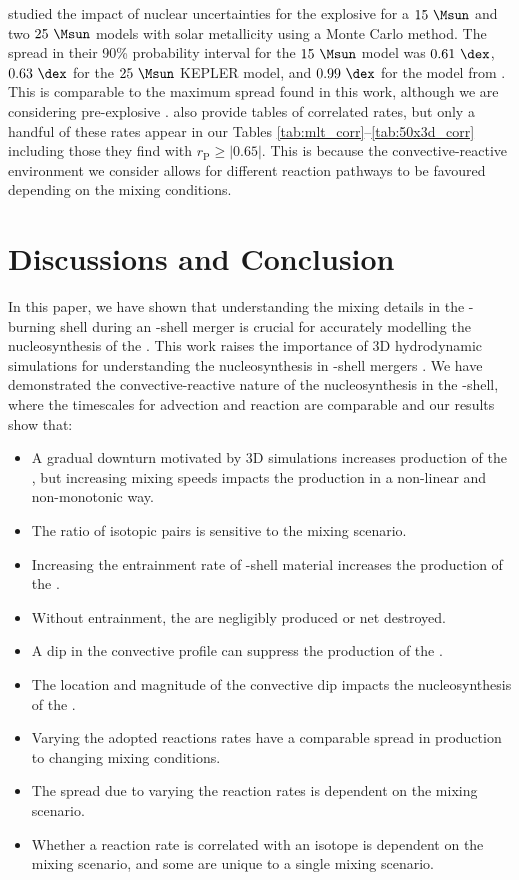 \cite{rauscherUncertaintiesProductionNuclei2016} studied the impact of nuclear uncertainties for the explosive \gpr{} for a $15~\Msun$ and two $25~\Msun$ models with solar metallicity using a Monte Carlo method.
The spread in their 90\% probability interval for the $15~\Msun$ model was $0.61~\dex$, $0.63~\dex$ for the $25~\Msun$ KEPLER model, and $0.99~\dex$ for the model from \cite{hashimotoExplosiveNucleosynthesisSupernova1989}.
This is comparable to the maximum spread found in this work, although we are considering pre-explosive \gprn{}.
\cite{rauscherUncertaintiesProductionNuclei2016} also provide tables of correlated rates, but only a handful of these rates appear in our Tables \ref{tab:mlt_corr}{--}\ref{tab:50x3d_corr} including those they find with $r_\mathrm{P} \geq |0.65|$.
This is because the convective-reactive environment we consider allows for different reaction pathways to be favoured depending on the mixing conditions.

\section{Discussions and Conclusion} \label{sec:discussion_conclusion}

In this paper, we have shown that understanding the mixing details in the \oxygen[]-burning shell during an \oxygen[]-\carbon[] shell merger is crucial for accurately modelling the nucleosynthesis of the \pnucn.
This work raises the importance of 3D hydrodynamic simulations for understanding the nucleosynthesis in \oxygen[]-\carbon[] shell mergers \citep{bazanConvectionNucleosynthesisCore1994, yadavLargescaleMixingViolent2020a, rizzutiShellMergersLate2024a}.
We have demonstrated the convective-reactive nature of the nucleosynthesis in the \oxygen[]-shell, where the timescales for advection and reaction are comparable and our results show that:
\begin{itemize}
\item A gradual downturn motivated by 3D simulations increases production of the \pnucn{}, but increasing mixing speeds impacts the production in a non-linear and non-monotonic way.
\item The ratio of isotopic pairs is sensitive to the mixing scenario.
\item Increasing the entrainment rate of \carbon[]-shell material increases the production of the \pnucn{}.
\item Without entrainment, the \pnucn{} are negligibly produced or net destroyed.
\item A dip in the convective profile can suppress the production of the \pnucn{}.
\item The location and magnitude of the convective dip impacts the nucleosynthesis of the \pnucn{}.
\item Varying the adopted reactions rates have a comparable spread in production to changing mixing conditions.
\item The spread due to varying the reaction rates is dependent on the mixing scenario.
\item Whether a reaction rate is correlated with an isotope is dependent on the mixing scenario, and some are unique to a single mixing scenario.
\end{itemize}

